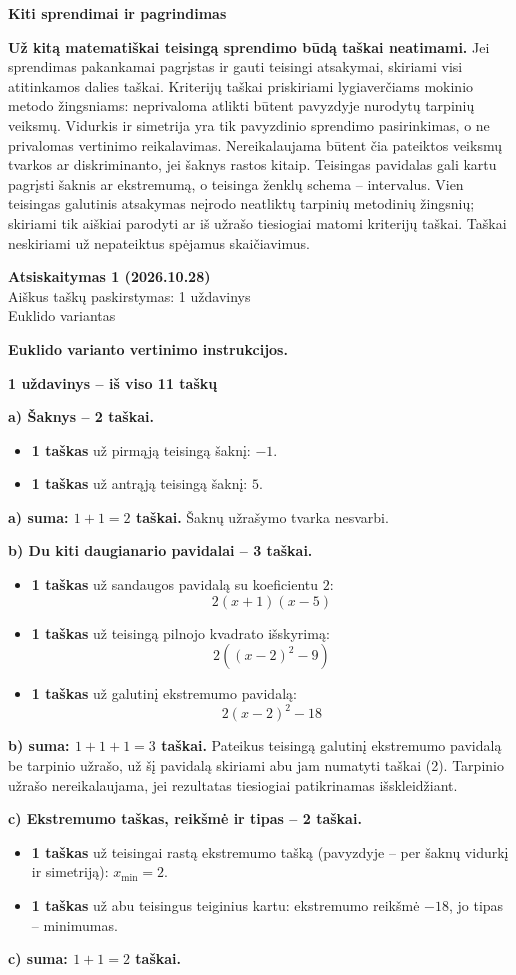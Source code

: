 \documentclass[11pt]{article}
\newcommand{\antraste}[1]{\begin{center}\Large\textbf{Atsiskaitymas 1 (2026.10.28)}\\\large #1\\\normalsize Euklido variantas\end{center}}
\newcommand{\sk}[1]{\par\medskip\textbf{#1}\par}
\begin{document}
\sk{Kiti sprendimai ir pagrindimas}
\textbf{Už kitą matematiškai teisingą sprendimo būdą taškai neatimami.} Jei sprendimas pakankamai pagrįstas ir gauti teisingi atsakymai, skiriami visi atitinkamos dalies taškai. Kriterijų taškai priskiriami lygiaverčiams mokinio metodo žingsniams: neprivaloma atlikti būtent pavyzdyje nurodytų tarpinių veiksmų. Vidurkis ir simetrija yra tik pavyzdinio sprendimo pasirinkimas, o ne privalomas vertinimo reikalavimas. Nereikalaujama būtent čia pateiktos veiksmų tvarkos ar diskriminanto, jei šaknys rastos kitaip. Teisingas pavidalas gali kartu pagrįsti šaknis ar ekstremumą, o teisinga ženklų schema -- intervalus. Vien teisingas galutinis atsakymas neįrodo neatliktų tarpinių metodinių žingsnių; skiriami tik aiškiai parodyti ar iš užrašo tiesiogiai matomi kriterijų taškai. Taškai neskiriami už nepateiktus spėjamus skaičiavimus.
\normalsize\newpage
\antraste{Aiškus taškų paskirstymas: 1 uždavinys}
\textbf{Euklido varianto vertinimo instrukcijos.}
\sk{1 uždavinys -- iš viso 11 taškų}
\textbf{a) Šaknys -- 2 taškai.}
\begin{itemize}
\item \textbf{1 taškas} už pirmąją teisingą šaknį: $-1$.
\item \textbf{1 taškas} už antrąją teisingą šaknį: $5$.
\end{itemize}
\textbf{a) suma: $1+1=2$ taškai.} Šaknų užrašymo tvarka nesvarbi.

\textbf{b) Du kiti daugianario pavidalai -- 3 taškai.}
\begin{itemize}
\item \textbf{1 taškas} už sandaugos pavidalą su koeficientu $2$:
\[2(x+1)(x-5)\]
\item \textbf{1 taškas} už teisingą pilnojo kvadrato išskyrimą:
\[2((x-2)^2-9)\]
\item \textbf{1 taškas} už galutinį ekstremumo pavidalą:
\[2(x-2)^2-18\]
\end{itemize}
\textbf{b) suma: $1+1+1=3$ taškai.} Pateikus teisingą galutinį ekstremumo pavidalą be tarpinio užrašo, už šį pavidalą skiriami abu jam numatyti taškai (2). Tarpinio užrašo nereikalaujama, jei rezultatas tiesiogiai patikrinamas išskleidžiant.

\textbf{c) Ekstremumo taškas, reikšmė ir tipas -- 2 taškai.}
\begin{itemize}
\item \textbf{1 taškas} už teisingai rastą ekstremumo tašką (pavyzdyje -- per šaknų vidurkį ir simetriją): $x_{\min}=2$.
\item \textbf{1 taškas} už abu teisingus teiginius kartu: ekstremumo reikšmė $-18$, jo tipas -- minimumas.
\end{itemize}
\textbf{c) suma: $1+1=2$ taškai.}
\end{document}
